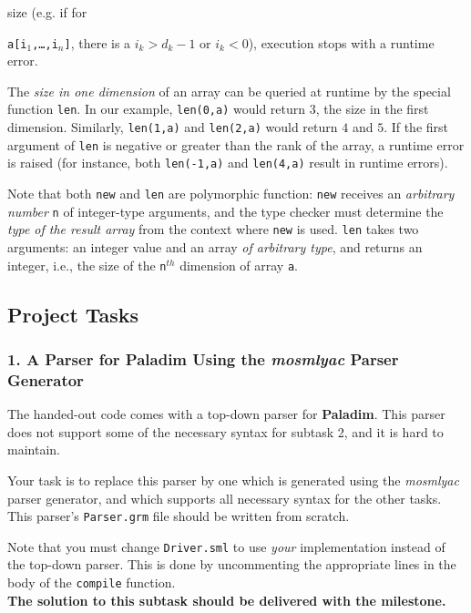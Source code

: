 \documentclass[12pt,a4paper]{article}
\newcommand{\paladim}{\textbf{Paladim}\xspace}
\begin{document}
size (e.g. if for {\texttt{a[i$_1$,\ldots,i$_n$]}, there is a $i_k > d_k-1$
or $i_k < 0$), execution stops with a runtime error.

The \emph{size in one dimension} of an array can be queried at runtime by
the special function {\tt len}. In our example, {\tt len(0,a)} would
return $3$, the size in the first dimension. Similarly, {\tt len(1,a)}
and {\tt len(2,a)} would return $4$ and $5$. If the first argument
of {\tt len} is negative or greater than the rank of the array, a runtime
error is raised (for instance,
both {\tt len(-1,a)} and {\tt len(4,a)} result in runtime errors).

Note that both {\tt new} and {\tt len} are polymorphic function:
\texttt{new} receives an \emph{arbitrary number} \texttt{n} of
    integer-type arguments, and the type checker must determine the
    \emph{type of the result array} from the context where \texttt{new}
    is used.
\texttt{len} takes two arguments: an integer value and an array
        \emph{of arbitrary type}, and returns an integer, i.e., the size
        of the \texttt{n$^{th}$} dimension of array \texttt{a}.

\subsection{Project Tasks}
\label{sec:tasks}

\subsubsection*
  {1. A Parser for \paladim Using the \emph{mosmlyac} Parser Generator}

The handed-out code comes with a top-down parser for \paladim. This parser
does not support some of the necessary syntax for subtask 2, and it is
hard to maintain.

Your task is to replace this parser by one which is generated using the
\emph{mosmlyac} parser generator, and which supports all necessary syntax
for the other tasks.
This parser's \texttt{Parser.grm} file should be written from scratch.

Note that you must change \texttt{Driver.sml} to use \emph{your} implementation
instead of the top-down parser. This is done by uncommenting the appropriate
lines in the body of the \texttt{compile} function.\\[1ex]
\textbf{The solution to this subtask should be delivered with the milestone.}

}
\end{document}
